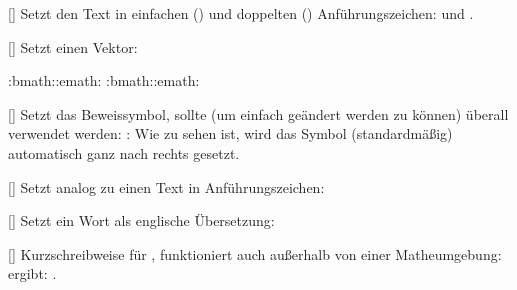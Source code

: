 [\cmdlist{}]
Setzt den Text in einfachen () und doppelten () Anführungszeichen:  und .

%
%
%

[\cmdlist{}]
Setzt einen Vektor:
\begin{plainlatex}
:bmath::emath: %
:bmath::emath: %
\end{plainlatex}

%
%
%

[]
Setzt das Beweissymbol, sollte (um einfach geändert werden zu können) überall verwendet werden: : \qedsymbol\newline
Wie zu sehen ist, wird das Symbol (standardmäßig) automatisch ganz nach rechts gesetzt.

%
%
%

[]%
Setzt analog zu  einen Text in Anführungszeichen:
\begin{latex*}
\end{latex*}

%
%
%

[]
Setzt ein Wort als englische Übersetzung:
\begin{latex*}
\end{latex*}

%
%
%

[]
Kurzschreibweise für , funktioniert auch außerhalb von einer Matheumgebung:  ergibt: \cd.

%
%
%

